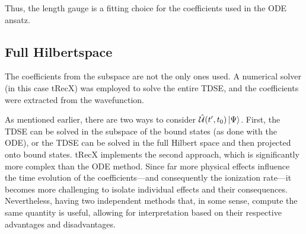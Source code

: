 Thus, the length gauge is a fitting choice for the coefficients used in the ODE ansatz.









\subsection{Full Hilbertspace}
The coefficients from the subspace are not the only ones used. A numerical solver (in this case tRecX) was employed to solve the entire TDSE, and the coefficients were extracted from the wavefunction.

As mentioned earlier, there are two ways to consider $\hat{\mathcal{U}}(t',t_0)\ket{\Psi}$.
First, the TDSE can be solved in the subspace of the bound states (as done with the ODE), or the TDSE can be solved in the full Hilbert space and then projected onto bound states.
tRecX implements the second approach, which is significantly more complex than the ODE method.
Since far more physical effects influence the time evolution of the coefficients—and consequently the ionization rate—it becomes more challenging to isolate individual effects and their consequences.
Nevertheless, having two independent methods that, in some sense, compute the same quantity is useful, allowing for interpretation based on their respective advantages and disadvantages.

